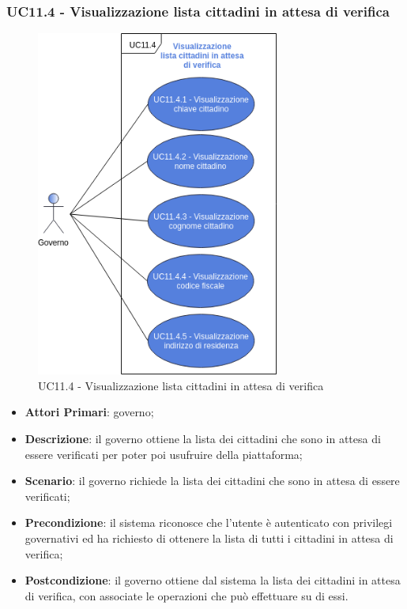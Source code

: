 \subsubsection{UC11.4 - Visualizzazione lista cittadini in attesa di verifica}
\begin{figure}[h]
	\includegraphics[width=8cm]{res/images/UC11-4.png} %
	\centering
	\caption{UC11.4 - Visualizzazione lista cittadini in attesa di verifica}
\end{figure}
\begin{itemize}
	\item \textbf{Attori Primari}: governo;
	\item \textbf{Descrizione}: il governo ottiene la lista dei cittadini che sono in attesa di essere verificati per poter poi usufruire della piattaforma;
	\item \textbf{Scenario}: il governo richiede la lista dei cittadini che sono in attesa di essere verificati;
	\item \textbf{Precondizione}: il sistema riconosce che l'utente è autenticato con privilegi governativi ed ha richiesto di ottenere la lista di tutti i cittadini in attesa di verifica;
	\item \textbf{Postcondizione}: il governo ottiene dal sistema la lista dei cittadini in attesa di verifica, con associate le operazioni che può effettuare su di essi.
\end{itemize}
